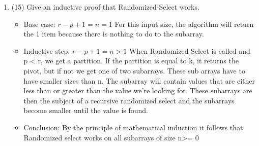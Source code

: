 \documentclass[12pt]{article}
\newenvironment{problem}[2][Problem]{\begin{trivlist}
\item[\hskip \labelsep {\bfseries #1}\hskip \labelsep {\bfseries #2.}]}{\end{trivlist}}
\begin{document}
\begin{enumerate}
\item (15) Give an inductive proof that Randomized-Select works.
\begin{itemize}
\item Base case: $ r-p+1 = n = 1$ \newline
For this input size, the algorithm will return the 1 item because there is nothing to do to the subarray.
\item Inductive step: $r-p+1 = n > 1$ \newline
When Randomized Select is called and p < r, we get a partition. If the partition is equal to k, it returns the pivot, but if not we get one of two subarrays. These sub arrays have to have smaller sizes than n. The subarray will contain values that are either less than or greater than the value we're looking for. These subarrays are then the subject of a recursive randomized select and the subarrays become smaller until the value is found.
\item Conclusion: By the principle of mathematical induction it follows that Randomized select works on all subarrays of size n\textgreater= 0
\end{itemize}


\end{enumerate}

 






\end{document}
